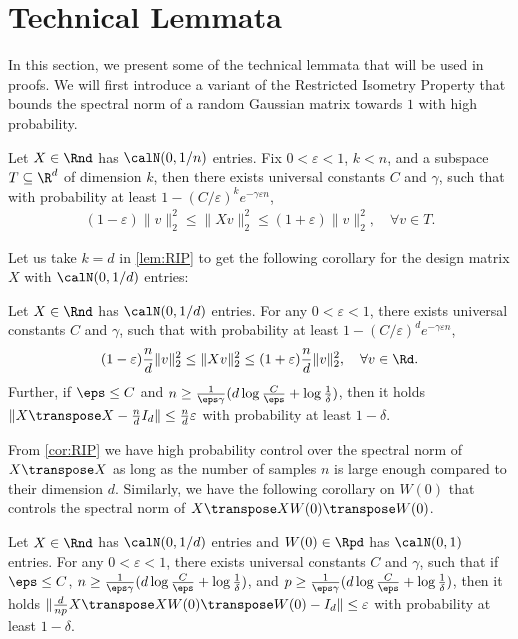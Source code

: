 \section{Technical Lemmata}

In this section, we present some of the technical lemmata that will be used in proofs.
We will first introduce a variant of the Restricted Isometry Property that bounds the spectral norm of a random Gaussian matrix towards $1$ with high probability.

\begin{lemma}\label{lem:RIP}
    Let $X\in \Rnd$ has \iid $\calN(0,1/n)$ entries. Fix $0<\varepsilon<1$, $k < n$, and a subspace $T\subseteq \R^d$ of dimension $k$, then there exists universal constants $C$ and $\gamma$, such that with probability at least $1-(C/\varepsilon)^k e^{-\gamma\varepsilon n}$,
    \begin{align*}
    (1-\varepsilon)\|v\|^2_2 \leq \|Xv\|^2_2 \leq (1+\varepsilon)\|v\|^2_2, \quad \forall v\in T.
    \end{align*}
\end{lemma}
Let us take $k = d$ in \cref{lem:RIP} to get the following corollary for the design matrix $X$ with \iid $\calN(0,1/d)$ entries:
\begin{corollary}\label{cor:RIP}
    Let $X\in \Rnd$ has \iid $\calN(0,1/d)$ entries. For any $0<\varepsilon<1$, there exists universal constants $C$ and $\gamma$, such that with probability at least $1-(C/\varepsilon)^d e^{-\gamma\varepsilon n}$,
    \begin{align*}
        (1-\varepsilon)\frac{n}{d}\|v\|^2_2 \leq \|Xv\|^2_2 \leq (1+\varepsilon)\frac{n}{d}\|v\|^2_2, \quad \forall v\in\Rd.
    \end{align*}
    Further, if $\eps \leq C$ and $n \geq \frac{1}{\eps\gamma} (d\log\frac{C}{\eps} + \log\frac{1}{\delta})$, then it holds $\|X\transpose X - \frac{n}{d} I_d\| \leq \frac{n}{d}\varepsilon$ with probability at least $1-\delta$.
\end{corollary}
From \cref{cor:RIP} we have high probability control over the spectral norm of $X\transpose X$ as long as the number of samples $n$ is large enough compared to their dimension $d$.
Similarly, we have the following corollary on $W(0)$ that controls the spectral norm of $X\transpose XW(0)\transpose W(0)$.

\begin{corollary}\label{cor:W0-tail}
    Let $X\in \Rnd$ has \iid $\calN(0,1/d)$ entries and $W(0)\in \Rpd$ has \iid $\calN(0,1)$ entries. For any $0<\varepsilon<1$, there exists universal constants $C$ and $\gamma$, such that if $\eps \leq C$, $n \geq \frac{1}{\eps\gamma} (d\log\frac{C}{\eps} + \log\frac{1}{\delta})$, and $p \geq \frac{1}{\eps\gamma} (d\log\frac{C}{\eps} + \log\frac{1}{\delta})$, then it holds $\|\frac{d}{np}X\transpose XW(0)\transpose W(0) - I_d\| \leq \varepsilon$ with probability at least $1-\delta$.
\end{corollary}

